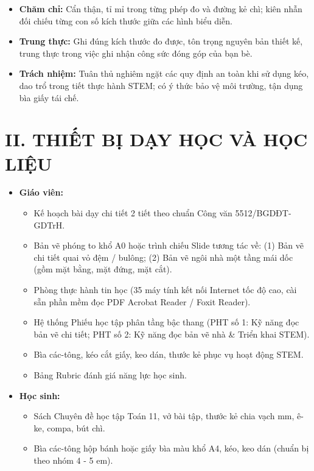 \documentclass[12pt, a4paper]{article}
\begin{document}
\begin{itemize}[leftmargin=1.2cm]
    \item \textbf{Chăm chỉ:} Cẩn thận, tỉ mỉ trong từng phép đo và đường kẻ chì; kiên nhẫn đối chiếu từng con số kích thước giữa các hình biểu diễn.
    \item \textbf{Trung thực:} Ghi đúng kích thước đo được, tôn trọng nguyên bản thiết kế, trung thực trong việc ghi nhận công sức đóng góp của bạn bè.
    \item \textbf{Trách nhiệm:} Tuân thủ nghiêm ngặt các quy định an toàn khi sử dụng kéo, dao trổ trong tiết thực hành STEM; có ý thức bảo vệ môi trường, tận dụng bìa giấy tái chế.
\end{itemize}

\section*{II. THIẾT BỊ DẠY HỌC VÀ HỌC LIỆU}

\begin{itemize}[leftmargin=1.2cm]
    \item \textbf{Giáo viên:}
    \begin{itemize}[leftmargin=0.6cm]
        \item Kế hoạch bài dạy chi tiết 2 tiết theo chuẩn Công văn 5512/BGDĐT-GDTrH.
        \item Bản vẽ phóng to khổ A0 hoặc trình chiếu Slide tương tác về: (1) Bản vẽ chi tiết quai vỏ đệm / bulông; (2) Bản vẽ ngôi nhà một tầng mái dốc (gồm mặt bằng, mặt đứng, mặt cắt).
        \item Phòng thực hành tin học (35 máy tính kết nối Internet tốc độ cao, cài sẵn phần mềm đọc PDF Acrobat Reader / Foxit Reader).
        \item Hệ thống Phiếu học tập phân tầng bậc thang (PHT số 1: Kỹ năng đọc bản vẽ chi tiết; PHT số 2: Kỹ năng đọc bản vẽ nhà \& Triển khai STEM).
        \item Bìa các-tông, kéo cắt giấy, keo dán, thước kẻ phục vụ hoạt động STEM.
        \item Bảng Rubric đánh giá năng lực học sinh.
    \end{itemize}

    \item \textbf{Học sinh:}
    \begin{itemize}[leftmargin=0.6cm]
        \item Sách Chuyên đề học tập Toán 11, vở bài tập, thước kẻ chia vạch mm, ê-ke, compa, bút chì.
        \item Bìa các-tông hộp bánh hoặc giấy bìa màu khổ A4, kéo, keo dán (chuẩn bị theo nhóm 4 - 5 em).
    \end{itemize}
\end{itemize}
\end{document}
